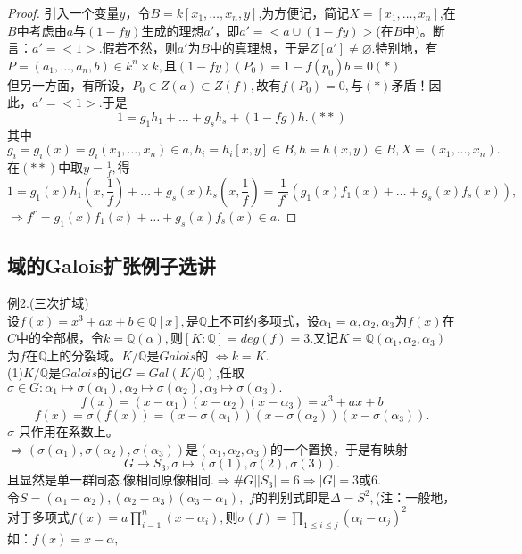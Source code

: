 \documentclass[UTF8]{article}
\begin{document}
\begin{proof}
	引入一个变量$y$，令$B=k[x_1,\ldots,x_n,y]$,为方便记，简记$X=[x_1,\ldots,x_n]$,在$B$中考虑由$a$与$(1-fy)$生成的理想$a'$，即$a'=<a\cup (1-fy)>$(在$B$中)。断言：$a'=<1>$.假若不然，则$a'$为$B$中的真理想，于是$Z[a']\neq \varnothing.$特别地，有$P=(a_1,\ldots,a_n,b)\in k^n\times k,$且$(1-fy)(P_0)=1-f(p_0)b=0(\ast)$\\
	但另一方面，有所设，$P_0\in Z(a)\subset Z(f),$故有$f(P_0)=0,$与$(\ast)$矛盾！因此，$a'=<1>.$于是
	$$1=g_1h_1+\ldots+g_sh_s+(1-fg)h.(\ast\ast)$$
	其中$g_i=g_i(x)=g_i(x_1,\ldots,x_n)\in a,h_i=h_i[x,y]\in B,h=h(x,y)\in B,X=(x_1,\ldots,x_n).$在$(\ast\ast)$中取$y=\frac{1}{f},$得
	$$1=g_1(x)h_1(x,\frac{1}{f})+\ldots+g_s(x)h_s(x,\frac{1}{f})=\frac{1}{f^r}(g_1(x)f_1(x)+\ldots+g_s(x)f_s(x)),$$
	$\Rightarrow f^r=g_1(x)f_1(x)+\ldots+g_s(x)f_s(x)\in a.$
\end{proof}
\subsection{域的Galois扩张例子选讲}
例2.(三次扩域)\\
设$f(x)=x^3+ax+b\in \mathbb{Q}[x],$是$\mathbb{Q}$上不可约多项式，设$\alpha_1=\alpha,\alpha_2,\alpha_3$为$f(x)$在$C$中的全部根，令$k=\mathbb{Q}(\alpha),$则$[K:\mathbb{Q}]=deg(f)=3.$又记$K=\mathbb{Q}(\alpha_1,\alpha_2,\alpha_3)$为$f$在$\mathbb{Q}$上的分裂域。$K/\mathbb{Q}$是$Galois$的
$\Leftrightarrow k=K.$\\
(1)$K/\mathbb{Q}$是$Galois$的记$G=Gal(K/\mathbb{Q})$,任取$\sigma\in G:\alpha_1\longmapsto \sigma(\alpha_1),\alpha_2\longmapsto \sigma(\alpha_2),\alpha_3\longmapsto \sigma(\alpha_3).$\\
$$
f(x)=(x-\alpha_1)(x-\alpha_2)(x-\alpha_3)=x^3+ax+b$$
$$f(x)=\sigma(f(x))=(x-\sigma(\alpha_1))(x-\sigma(\alpha_2))(x-\sigma(\alpha_3)).$$
$\sigma$ 只作用在系数上。\\
$\Rightarrow(\sigma(\alpha_1),\sigma(\alpha_2),\sigma(\alpha_3))$是$(\alpha_1,\alpha_2,\alpha_3)$的一个置换，于是有映射
$$G\longrightarrow S_3,\sigma\longmapsto(\sigma(1),\sigma(2),\sigma(3)).$$
且显然是单一群同态.像相同原像相同.$\Rightarrow \#G||S_3|=6\Rightarrow|G|=3$或6.\\
令$S=(\alpha_1-\alpha_2),(\alpha_2-\alpha_3)(\alpha_3-\alpha_1),$ $f$的判别式即是$\Delta=S^2,$(注：一般地，对于多项式$f(x)=a\prod\limits_{i=1}^n(x-\alpha_i),$则$\sigma(f)=\prod\limits_{1\leqslant i\leqslant j}(\alpha_i-\alpha_j)^2$\\
如：$f(x)=x-\alpha,$
\end{document}
